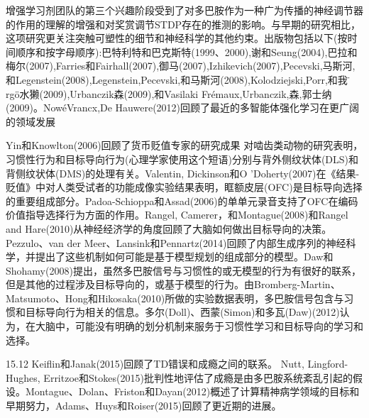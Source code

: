 增强学习剂团队的第三个兴趣阶段受到了对多巴胺作为一种广为传播的神经调节器的作用的理解的增强和对奖赏调节STDP存在的推测的影响。与早期的研究相比，这项研究更关注突触可塑性的细节和神经科学的其他约束。出版物包括以下(按时间顺序和按字母顺序):巴特利特和巴克斯特(1999、2000),谢和Seung(2004),巴拉和梅尔(2007),Farries和Fairhall(2007),御马(2007),Izhikevich(2007),Pecevski,马斯河,和Legenstein(2008),Legenstein,Pecevski,和马斯河(2008),Kolodziejski,Porr,和我们̈rgö水獭(2009),Urbanczik森(2009),和Vasilaki Frémaux,Urbanczik,森,郭士纳(2009)。NowéVrancx,De Hauwere(2012)回顾了最近的多智能体强化学习在更广阔的领域发展

Yin和Knowlton(2006)回顾了货币贬值专家的研究成果
对啮齿类动物的研究表明，习惯性行为和目标导向行为(心理学家使用这个短语)分别与背外侧纹状体(DLS)和背侧纹状体(DMS)的处理有关。Valentin, Dickinson和O 'Doherty(2007)在《结果-贬值》中对人类受试者的功能成像实验结果表明，眶额皮层(OFC)是目标导向选择的重要组成部分。Padoa-Schioppa和Assad(2006)的单单元录音支持了OFC在编码价值指导选择行为方面的作用。Rangel, Camerer，和Montague(2008)和Rangel and Hare(2010)从神经经济学的角度回顾了大脑如何做出目标导向的决策。Pezzulo、van der Meer、Lansink和Pennartz(2014)回顾了内部生成序列的神经科学，并提出了这些机制如何可能是基于模型规划的组成部分的模型。Daw和Shohamy(2008)提出，虽然多巴胺信号与习惯性的或无模型的行为有很好的联系，但是其他的过程涉及目标导向的，或基于模型的行为。由Bromberg-Martin、Matsumoto、Hong和Hikosaka(2010)所做的实验数据表明，多巴胺信号包含与习惯和目标导向行为相关的信息。多尔(Doll)、西蒙(Simon)和多瓦(Daw)(2012)认为，在大脑中，可能没有明确的划分机制来服务于习惯性学习和目标导向的学习和选择。

15.12 Keiflin和Janak(2015)回顾了TD错误和成瘾之间的联系。
Nutt, Lingford-Hughes, Erritzoe和Stokes(2015)批判性地评估了成瘾是由多巴胺系统紊乱引起的假设。Montague、Dolan、Friston和Dayan(2012)概述了计算精神病学领域的目标和早期努力，Adams、Huys和Roiser(2015)回顾了更近期的进展。
